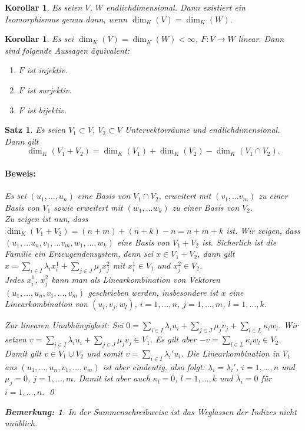 \documentclass{report}
\newcommand{\lb}{\lambda}
\theoremstyle{customrem}
\newtheorem*{bemerkung}{Bemerkung\textnormal:}
\theoremstyle{customdef}
\newtheorem{korrolar}[definition]{Korollar}
\newtheorem{satz}[definition]{Satz}
\renewenvironment{proof}{\paragraph{Beweis: }}{\qed}
\begin{document}
	\begin{korrolar}
		Es seien \(V\), \(W\) endlichdimensional. Dann existiert ein Isomorphismus genau dann, wenn \(\dim_K(V)=\dim_K(W)\).
	\end{korrolar}
	\pagebreak[3]
	\begin{korrolar}
		Es sei \(\dim_K(V)=\dim_K(W) < \infty\), \(F:V\to W\) linear. Dann sind folgende Aussagen äquivalent:
		
		\begin{enumerate}[leftmargin = 7cm]
			\item[i)] \(F\) ist injektiv.
			\item[ii)] \(F\) ist surjektiv.
			\item[iii)] \(F\) ist bijektiv.
		\end{enumerate}
	\end{korrolar}
	
	\begin{satz}
		Es seien \(V_1 \subset V\), \(V_2 \subset V\) Untervektorräume und endlichdimensional. Dann gilt \[\dim_K(V_1 + V_2) = \dim_K(V_1) + \dim_K(V_2) - \dim_K(V_1 \cap V_2).\]
		
		\vspace{.25cm}
		\begin{proof}
			Es sei \((u_1, \ldots, u_n)\) eine Basis von \(V_1\cap V_2\), erweitert mit \((v_1, \ldots v_m)\) zu einer Basis von \(V_1\) sowie erweitert mit \((w_1, \ldots w_k)\) zu einer Basis von \(V_2\). \\
			
			Zu zeigen ist nun, dass \(\dim_K(V_1 + V_2) = (n+m) + (n+k) -n = n+m+k\) ist. Wir zeigen, dass \((u_1, \ldots u_n, v_1, \ldots v_m,  w_1, \ldots, w_k)\) eine Basis von \(V_1 + V_2\) ist. Sicherlich ist die Familie ein Erzeugendensystem, denn sei \(x\in V_1 + V_2\), dann gilt \(x = \sum_{i\in I}\lb_i x_i^1 + \sum_{j\in J} \mu_j x_j^2\) mit \(x_i^1\in V_1\) und \(x_j^2\in V_2\).\\
			
			Jedes \(x_i^1\), \(x_j^2\) kann man als Linearkombination von Vektoren \((u_1,\ldots, u_n, v_1, \ldots, v_m)\) geschrieben werden, insbesondere ist \(x\) eine Linearkombination von \((u_i, v_j, w_l)\), \(i = 1,\ldots, n\), \(j=1, \ldots, m\), \(l = 1, \ldots, k\). 
			
			Zur linearen Unabhängigkeit: Sei \(0=\sum_{i\in I}\lb_i u_i + \sum_{j\in J} \mu_j v_j + \sum_{l\in L} \kappa_l w_l\). Wir setzen \(v = \sum_{i\in I} \lb_i u_i + \sum_{j \in J} \mu_j v_j\in V_1\). Es gilt aber \(-v = \sum_{l\in L}\kappa_l w_l\in V_2\). Damit gilt \(v\in V_1 \cup V_2\) und somit \(v=\sum_{i\in I}\lb_i'u_i\). Die Linearkombination in \(V_1\) aus \((u_1, \ldots, u_n, v_1, \ldots, v_m)\) ist aber eindeutig, also folgt: \(\lb_i = \lb_i'\), \(i = 1, \ldots, n\) und \(\mu_j = 0\), \(j =1, \ldots, m\). Damit ist aber auch \(\kappa_l=0\), \(l=1, \ldots, k\) und \(\lb_i=0\) für \(i=1, \ldots, n\).
		\end{proof}
		\vspace{.75cm}
		\begin{bemerkung}
			In der Summenschreibweise ist das Weglassen der Indizes nicht unüblich.
		\end{bemerkung}
	\end{satz}
	
\end{document}
